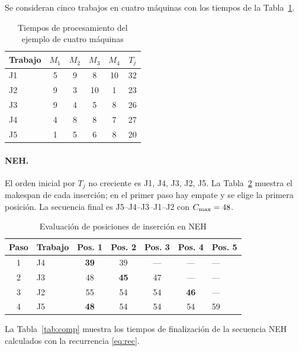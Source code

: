 Se consideran cinco trabajos en cuatro máquinas con los tiempos de la
Tabla~\ref{tab:datos}.

\begin{table}[htbp]
\caption{Tiempos de procesamiento del ejemplo de cuatro máquinas}\label{tab:datos}
\centering
\begin{tabular}{@{}lccccc@{}}
\toprule
Trabajo & $M_1$ & $M_2$ & $M_3$ & $M_4$ & $T_j$ \\
\midrule
J1 & 5 & 9 & 8 & 10 & 32 \\
J2 & 9 & 3 & 10 & 1 & 23 \\
J3 & 9 & 4 & 5 & 8 & 26 \\
J4 & 4 & 8 & 8 & 7 & 27 \\
J5 & 1 & 5 & 6 & 8 & 20 \\
\bottomrule
\end{tabular}
\end{table}

\paragraph{NEH.} El orden inicial por $T_j$ no creciente es J1, J4, J3, J2, J5. La
Tabla~\ref{tab:neh} muestra el makespan de cada inserción; en el primer paso hay empate
y se elige la primera posición. La secuencia final es J5--J4--J3--J1--J2 con $C_{\max}=48$.

\begin{table}[htbp]
\caption{Evaluación de posiciones de inserción en NEH}\label{tab:neh}
\centering
\begin{tabular}{@{}clccccl@{}}
\toprule
Paso & Trabajo & Pos. 1 & Pos. 2 & Pos. 3 & Pos. 4 & Pos. 5 \\
\midrule
1 & J4 & \textbf{39} & 39 & --- & --- & --- \\
2 & J3 & 48 & \textbf{45} & 47 & --- & --- \\
3 & J2 & 55 & 54 & 54 & \textbf{46} & --- \\
4 & J5 & \textbf{48} & 54 & 54 & 54 & 59 \\
\bottomrule
\end{tabular}
\end{table}

La Tabla~\ref{tab:comp} muestra los tiempos de finalización de la secuencia NEH calculados
con la recurrencia \eqref{eq:rec}.


